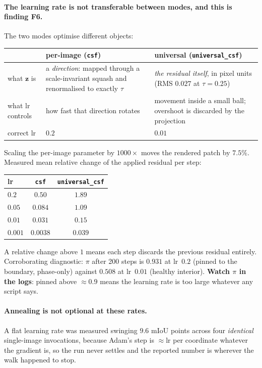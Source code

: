 \documentclass[11pt,a4paper]{article}
\begin{document}
\paragraph{The learning rate is not transferable between modes, and this is
finding F6.} The two modes optimise different objects:
\begin{center}
\small
\begin{tabular}{@{}lL{5.1cm}L{4.9cm}@{}}
\toprule
 & \textbf{per-image (\texttt{csf})} & \textbf{universal (\texttt{universal\_csf})} \\
\midrule
what $\mathbf{z}$ is & a \emph{direction}: mapped through a scale-invariant
squash and renormalised to exactly $\tau$ & \emph{the residual itself}, in
pixel units (RMS $0.027$ at $\tau=0.25$) \\
what lr controls & how fast that direction rotates & movement inside a small
ball; overshoot is discarded by the projection \\
correct lr & $0.2$ & $0.01$ \\
\bottomrule
\end{tabular}
\end{center}
Scaling the per-image parameter by $1000\times$ moves the rendered patch by
$7.5\%$. Measured mean relative change of the applied residual per step:
\begin{center}
\begin{tabular}{@{}lcc@{}}
\toprule
lr & \texttt{csf} & \texttt{universal\_csf} \\
\midrule
$0.2$   & $0.50$   & $1.89$ \\
$0.05$  & $0.084$  & $1.09$ \\
$0.01$  & $0.031$  & $0.15$ \\
$0.001$ & $0.0038$ & $0.039$ \\
\bottomrule
\end{tabular}
\end{center}
A relative change above $1$ means each step discards the previous residual
entirely. Corroborating diagnostic: $\pi$ after 200 steps is $0.931$ at
lr~$0.2$ (pinned to the boundary, phase-only) against $0.508$ at lr~$0.01$
(healthy interior). \textbf{Watch $\pi$ in the logs}: pinned above
$\approx0.9$ means the learning rate is too large whatever any script says.

\paragraph{Annealing is not optional at these rates.}
A flat learning rate was measured swinging $9.6$ mIoU points across four
\emph{identical} single-image invocations, because Adam's step is
$\approx\mathrm{lr}$ per coordinate whatever the gradient is, so the run
never settles and the reported number is wherever the walk happened to stop.
\end{document}
